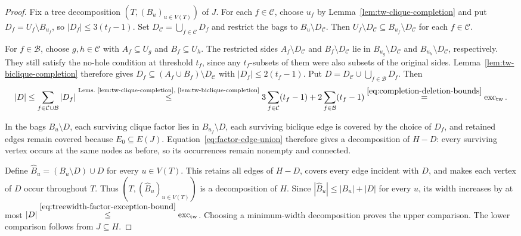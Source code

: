 \begin{proof}
Fix a tree decomposition $(T,(B_u)_{u\in V(T)})$ of $J$.
For each $f\in\mathcal C$, choose $u_f$ by
Lemma~\ref{lem:tw-clique-completion} and put
$D_f=U_f\setminus B_{u_f}$, so $|D_f|\le3(t_f-1)$.
Set $D_{\mathcal C}=\bigcup_{f\in\mathcal C}D_f$ and restrict
the bags to $B_u\setminus D_{\mathcal C}$.
Then $U_f\setminus D_{\mathcal C}\subseteq
B_{u_f}\setminus D_{\mathcal C}$ for each $f\in\mathcal C$.

For $f\in\mathcal B$, choose $g,h\in\mathcal C$ with
$A_f\subseteq U_g$ and $B_f\subseteq U_h$.
The restricted sides $A_f\setminus D_{\mathcal C}$ and
$B_f\setminus D_{\mathcal C}$ lie in
$B_{u_g}\setminus D_{\mathcal C}$ and
$B_{u_h}\setminus D_{\mathcal C}$, respectively. They still
satisfy the no-hole condition at threshold $t_f$, since any
$t_f$-subsets of them were also subsets of the original sides.
Lemma~\ref{lem:tw-biclique-completion} therefore gives
$D_f\subseteq(A_f\cup B_f)\setminus D_{\mathcal C}$ with
$|D_f|\le2(t_f-1)$.
Put $D=D_{\mathcal C}\cup\bigcup_{f\in\mathcal B}D_f$.
Then
\begin{equation}\label{eq:treewidth-factor-exception-bound}
|D|\le\sum_{f\in\mathcal C\cup\mathcal B}|D_f| \overset{\text{Lems.~\ref{lem:tw-clique-completion}, \ref{lem:tw-biclique-completion}}}{\leq}
 3\sum_{f\in\mathcal C}(t_f-1)+2\sum_{f\in\mathcal B}(t_f-1)
 \overset{\eqref{eq:completion-deletion-bounds}}{=}\operatorname{exc}_{\mathrm{tw}}.
\end{equation}

In the bags $B_u\setminus D$, each surviving clique factor lies
in $B_{u_f}\setminus D$, each surviving biclique edge is covered
by the choice of $D_f$, and retained edges remain covered because
$E_0\subseteq E(J)$. Equation~\eqref{eq:factor-edge-union}
therefore gives a decomposition of $H-D$: every surviving vertex
occurs at the same nodes as before, so its occurrences remain
nonempty and connected.

Define $\widehat B_u=(B_u\setminus D)\cup D$ for every $u\in V(T)$.
This retains all edges of $H-D$, covers every edge incident with
$D$, and makes each vertex of $D$ occur throughout $T$.
Thus $(T,(\widehat B_u)_{u\in V(T)})$ is a decomposition of $H$.
Since $|\widehat B_u|\le|B_u|+|D|$ for every $u$, its width
increases by at most
$|D|\overset{\eqref{eq:treewidth-factor-exception-bound}}{\leq}
\operatorname{exc}_{\mathrm{tw}}$.
Choosing a minimum-width decomposition proves the upper comparison.
The lower comparison follows from $J\subseteq H$.
\end{proof}


